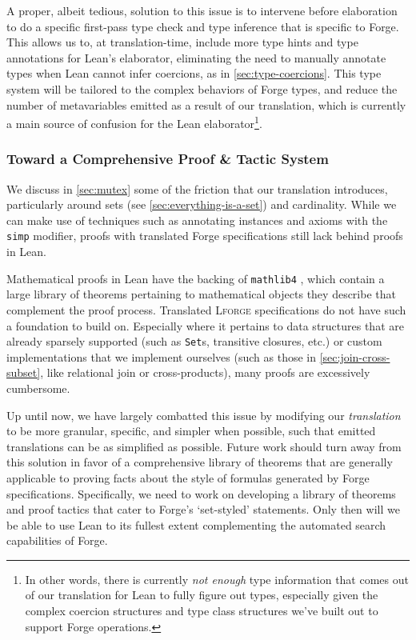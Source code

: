 A proper, albeit tedious, solution to this issue is to intervene before elaboration to do a specific first-pass type check and type inference that is specific to Forge. This allows us to, at translation-time, include more type hints and type annotations for Lean's elaborator, eliminating the need to manually annotate types when Lean cannot infer coercions, as in \cref{sec:type-coercions}. This type system will be tailored to the complex behaviors of Forge types, and reduce the number of metavariables emitted as a result of our translation, which is currently a main source of confusion for the Lean elaborator\footnote{In other words, there is currently \emph{not enough} type information that comes out of our translation for Lean to fully figure out types, especially given the complex coercion structures and type class structures we've built out to support Forge operations.}. 

\subsubsection{Toward a Comprehensive Proof \& Tactic System}

We discuss in \cref{sec:mutex} some of the friction that our translation introduces, particularly around sets (see \cref{sec:everything-is-a-set}) and cardinality. While we can make use of techniques such as annotating instances and axioms with the \texttt{simp} modifier, proofs with translated Forge specifications still lack behind proofs in Lean. 

Mathematical proofs in Lean have the backing of \texttt{mathlib4} \cite{moura2021lean}, which contain a large library of theorems pertaining to mathematical objects they describe that complement the proof process. Translated \textsc{Lforge} specifications do not have such a foundation to build on. Especially where it pertains to data structures that are already sparsely supported (such as \texttt{Set}s, transitive closures, etc.) or custom implementations that we implement ourselves (such as those in \cref{sec:join-cross-subset}, like relational join or cross-products), many proofs are excessively cumbersome. 

Up until now, we have largely combatted this issue by modifying our \emph{translation} to be more granular, specific, and simpler when possible, such that emitted translations can be as simplified as possible. Future work should turn away from this solution in favor of a comprehensive library of theorems that are generally applicable to proving facts about the style of formulas generated by Forge specifications. Specifically, we need to work on developing a library of theorems and proof tactics that cater to Forge's `set-styled' statements. Only then will we be able to use Lean to its fullest extent complementing the automated search capabilities of Forge. 

